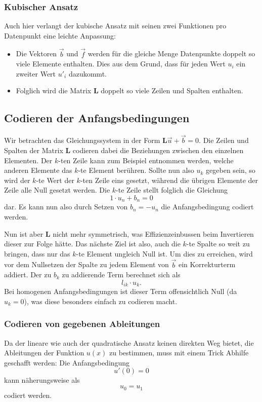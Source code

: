 \subsubsection{Kubischer Ansatz}
Auch hier verlangt der kubische Ansatz mit seinen zwei Funktionen pro Datenpunkt eine leichte Anpassung: 
\begin{itemize}
    \item Die Vektoren $\vec{b}$ und $\vec{f}$ werden für die gleiche Menge Datenpunkte doppelt so viele Elemente enthalten.
          Dies aus dem Grund, dass für jeden Wert $u_i$ ein zweiter Wert $u'_i$ dazukommt.
    \item Folglich wird die Matrix $\mathbf{L}$ doppelt so viele Zeilen und Spalten enthalten. 
\end{itemize}


\subsection{Codieren der Anfangsbedingungen\label{fem:1d:anfangsbedingungen}}
Wir betrachten das Gleichungssystem in der Form $\mathbf{L}\vec{u} + \vec{b} = 0$. 
Die Zeilen und Spalten der Matrix $\mathbf{L}$ codieren dabei die Beziehungen zwischen den einzelnen Elementen.
Der $k$-ten Zeile kann zum Beispiel entnommen werden, welche anderen Elemente das $k$-te Element berühren. 
Sollte nun also $u_k$ gegeben sein, so wird der $k$-te Wert der $k$-ten Zeile eins gesetzt, während die übrigen Elemente der Zeile alle Null gesetzt werden.
Die $k$-te Zeile stellt folglich die Gleichung 
\begin{equation}
    1 \cdot u_n + b_n = 0
\end{equation}
dar. 
Es kann nun also durch Setzen von $b_n = -u_n$ die Anfangsbedingung codiert werden.

Nun ist aber $\mathbf{L}$ nicht mehr symmetrisch, was Effizienzeinbussen beim Invertieren dieser zur Folge hätte.
Das nächste Ziel ist also, auch die $k$-te Spalte so weit zu bringen, dass nur das $k$-te Element ungleich Null ist.
Um dies zu erreichen, wird vor dem Nullsetzen der Spalte zu jedem Element von $\vec{b}$ ein Korrekturterm addiert.
Der zu $b_k$ zu addierende Term berechnet sich als
\begin{equation}
    l_{ik} \cdot u_k.
\end{equation}
Bei homogenen Anfangsbedingungen ist dieser Term offensichtlich Null (da $u_k = 0$), was diese besonders einfach zu codieren macht.

\subsubsection{Codieren von gegebenen Ableitungen}
Da der lineare wie auch der quadratische Ansatz keinen direkten Weg bietet, die Ableitungen der Funktion $u(x)$ zu bestimmen, muss mit einem Trick Abhilfe geschafft werden: 
Die Anfangsbedingung
\begin{equation}
    u'(0) = 0
\end{equation}
kann näherungsweise als 
\begin{equation}
    u_0 = u_1
\end{equation}
codiert werden. 


